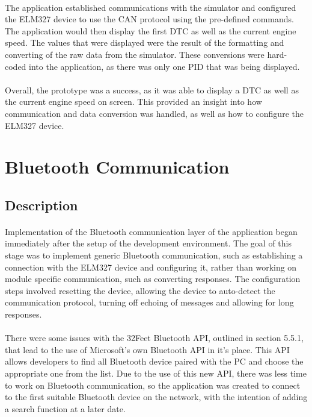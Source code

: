 	\paragraph{}{
	The application established communications with the simulator and configured the ELM327 device to use the CAN protocol using the pre-defined commands. The application would then display the first DTC as well as the current engine speed. The values that were displayed were the result of the formatting and converting of the raw data from the simulator. These conversions were hard-coded into the application, as there was only one PID that was being displayed.
	}
	\paragraph{}{	
	Overall, the prototype was a success, as it was able to display a DTC as well as the current engine speed on screen. This provided an insight into how communication and data conversion was handled, as well as how to configure the ELM327 device.
	}

\section{Bluetooth Communication}
	\subsection{Description}
		\paragraph{}{
		Implementation of the Bluetooth communication layer of the application began immediately after the setup of the development environment. The goal of this stage was to implement generic Bluetooth communication, such as establishing a connection with the ELM327 device and configuring it, rather than working on module specific communication, such as converting responses. The configuration steps involved resetting the device, allowing the device to auto-detect the communication protocol, turning off echoing of messages and allowing for long responses.
		}
		\paragraph{}{
		There were some issues with the 32Feet Bluetooth API, outlined in section 5.5.1, that lead to the use of Microsoft's own Bluetooth API in it's place. This API allows developers to find all Bluetooth device paired with the PC and choose the appropriate one from the list. Due to the use of this new API, there was less time to work on Bluetooth communication, so the application was created to connect to the first suitable Bluetooth device on the network, with the intention of adding a search function at a later date.
		}
